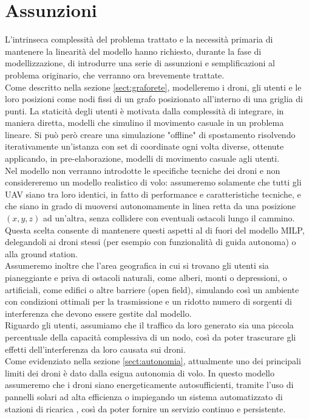 \section{Assunzioni}
L'intrinseca complessità del problema trattato e la necessità primaria di mantenere la linearità del modello hanno richiesto, durante la fase di modellizzazione, di introdurre una serie di assunzioni e semplificazioni al problema originario, che verranno ora brevemente trattate. \\
Come descritto nella sezione \ref{sect:graforete}, modelleremo i droni, gli utenti e le loro posizioni come nodi fissi di un grafo posizionato all'interno di una griglia di punti. La staticità degli utenti è motivata dalla complessità di integrare, in maniera diretta, modelli che simulino il movimento casuale in un problema lineare. Si può però creare una simulazione "offline" di spostamento risolvendo iterativamente un'istanza con set di coordinate ogni volta diverse, ottenute applicando, in pre-elaborazione, modelli di movimento casuale agli utenti.\\
Nel modello non verranno introdotte le specifiche tecniche dei droni e non considereremo un modello realistico di volo: assumeremo solamente che tutti gli UAV siano tra loro identici, in fatto di performance e caratteristiche tecniche, e che siano in grado di muoversi autonomamente in linea retta da una posizione $(x,y,z)$ ad un'altra, senza collidere con eventuali ostacoli lungo il cammino. Questa scelta consente di mantenere questi aspetti al di fuori del modello MILP, delegandoli ai droni stessi (per esempio con funzionalità di guida autonoma) o alla ground station. \\
Assumeremo inoltre che l'area geografica in cui si trovano gli utenti sia pianeggiante e priva di ostacoli naturali, come alberi, monti o depressioni, o artificiali, come edifici o altre barriere (open field), simulando così un ambiente con condizioni ottimali per la trasmissione e un ridotto numero di sorgenti di interferenza che devono essere gestite dal modello. \\
Riguardo gli utenti, assumiamo che il traffico da loro generato sia una piccola percentuale della capacità complessiva di un nodo, così da poter trascurare gli effetti dell'interferenza da loro causata sui droni. \\
Come evidenziato nella sezione \ref{sect:autonomia}, attualmente uno dei principali limiti dei droni è dato dalla esigua autonomia di volo. 
In questo modello assumeremo che i droni siano energeticamente autosufficienti, tramite l'uso di pannelli solari ad alta efficienza \cite{alta} o impiegando un sistema automatizzato di stazioni di ricarica \cite{Song2014}, così da poter fornire un servizio continuo e persistente. 
